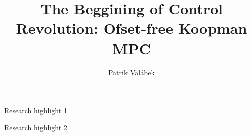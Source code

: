 \documentclass[preprint,12pt,authoryear]{elsarticle}
\theoremstyle{remark}
\begin{document}
\begin{frontmatter}



\title{The Beggining of Control Revolution: Ofset-free Koopman MPC} %


\author{Patrik Valábek} %


\begin{abstract}

\end{abstract}


\begin{highlights}
\item Research highlight 1
\item Research highlight 2
\end{highlights}

\begin{keyword}



\end{keyword}

\end{frontmatter}
\end{document}
